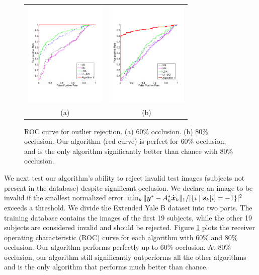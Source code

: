 \begin{figure}
\centering
\begin{tabular}{cc}
\includegraphics[height=2in]{figures_iccv/roc/eYB-60.pdf}&
\includegraphics[height=2in]{figures_iccv/roc/eYB-80.pdf}\\
(a) & (b)
\end{tabular}
\caption{ROC curve for outlier rejection. (a) 60\% occlusion. (b)
80\% occlusion. Our algorithm (red curve) is perfect for 60\% occlusion, and is the only algorithm significantly better than chance with 80\% occlusion.}\label{fig:yale-roc} \vspace{0mm}
\end{figure}

We next test our algorithm's ability to reject invalid test images
(subjects not present in the database) despite significant occlusion.
We declare an image to be invalid if the smallest normalized error
$\min_k \| {\boldsymbol{y}}^* - A_k^* \hat{{\boldsymbol{x}}}_k \|_1 / | \{ i \mid \boldsymbol{s}_k[i] = -1 \} |^2$ exceeds a threshold.
We divide the Extended Yale B dataset into two parts.
The training database contains the images of the first 19 subjects, while the other 19 subjects
are considered invalid and should be rejected. Figure \ref{fig:yale-roc} plots
the receiver operating characteristic (ROC) curve for each algorithm
with 60\% and 80\% occlusion. Our algorithm performs perfectly up
to 60\% occlusion. At 80\% occlusion, our algorithm still
significantly outperforms all the other algorithms and is the only
algorithm that performs much better than chance.\vspace{0mm}

